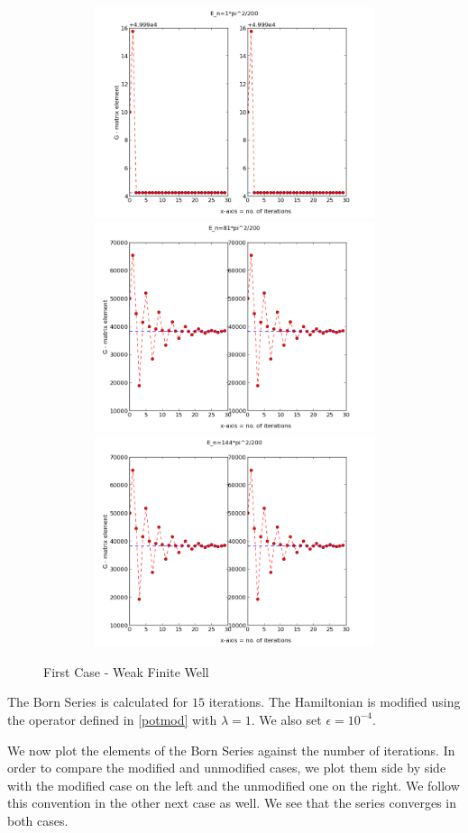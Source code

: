 \documentclass[a4paper,10pt]{report}
\begin{document}
\begin{center}
\begin{figure}[ht]
\includegraphics[width=360pt, height=175pt]{series1a.png}
\includegraphics[width=360pt, height=175pt]{series1b.png}
\includegraphics[width=360pt, height=175pt]{series1c.png}
\caption[\textwidth]{First Case - Weak Finite Well}
\end{figure}
\end{center}
The Born Series is calculated for $15$ iterations. The Hamiltonian is modified using the operator defined in \eqref{potmod} with
$\lambda=1$.  We also set $\epsilon=10^{-4}$. 

We now plot the elements of the Born Series against the number of iterations. In order
to compare the modified and unmodified cases, we plot them side by side with the modified case on the left and the unmodified one
on the right. We follow this convention in the other next case as well.
We see that the series converges in both cases.
\end{document}
